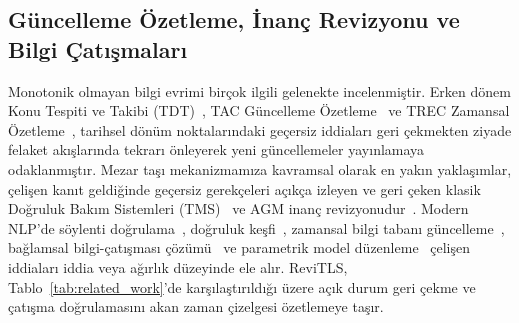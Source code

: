 ﻿\documentclass[journal]{IEEEtran}
\begin{document}
\subsection{G\"{u}ncelleme \"{O}zetleme, \.{I}nan\c{c} Revizyonu ve Bilgi \c{C}at{\i}\c{s}malar{\i}}
Monotonik olmayan bilgi evrimi bir\c{c}ok ilgili gelenekte incelenmi\c{s}tir. Erken d\"{o}nem Konu Tespiti ve Takibi (TDT)~\cite{allan2002topic}, TAC G\"{u}ncelleme \"{O}zetleme~\cite{dang2008overview} ve TREC Zamansal \"{O}zetleme~\cite{aslam2013trec, kedzie2015predicting}, tarihsel d\"{o}n\"{u}m noktalar{\i}ndaki ge\c{c}ersiz iddialar{\i} geri \c{c}ekmekten ziyade felaket ak{\i}\c{s}lar{\i}nda tekrar{\i} \"{o}nleyerek yeni g\"{u}ncellemeler yay{\i}nlamaya odaklanm{\i}\c{s}t{\i}r. Mezar ta\c{s}{\i} mekanizmam{\i}za kavramsal olarak en yak{\i}n yakla\c{s}{\i}mlar, \c{c}eli\c{s}en kan{\i}t geldi\u{g}inde ge\c{c}ersiz gerek\c{c}eleri a\c{c}{\i}k\c{c}a izleyen ve geri \c{c}eken klasik Do\u{g}ruluk Bak{\i}m Sistemleri (TMS)~\cite{doyle1979truth} ve AGM inan\c{c} revizyonudur~\cite{alchourron1985logic}. Modern NLP'de s\"{o}ylenti do\u{g}rulama~\cite{zubiaga2016analysing, kochkina2018all, thorne2018fever}, do\u{g}ruluk ke\c{s}fi~\cite{li2016survey}, zamansal bilgi taban{\i} g\"{u}ncelleme~\cite{dhingra2022time, kasai2023realtime}, ba\u{g}lamsal bilgi-\c{c}at{\i}\c{s}mas{\i} \c{c}\"{o}z\"{u}m\"{u}~\cite{xu2024knowledge} ve parametrik model d\"{u}zenleme~\cite{meng2022locating, mitchell2022fast} \c{c}eli\c{s}en iddialar{\i} iddia veya a\u{g}{\i}rl{\i}k d\"{u}zeyinde ele al{\i}r. ReviTLS, Tablo~\ref{tab:related_work}'de kar\c{s}{\i}la\c{s}t{\i}r{\i}ld{\i}\u{g}{\i} \"{u}zere a\c{c}{\i}k durum geri \c{c}ekme ve \c{c}at{\i}\c{s}ma do\u{g}rulamas{\i}n{\i} akan zaman \c{c}izelgesi \"{o}zetlemeye ta\c{s}{\i}r.
\end{document}
